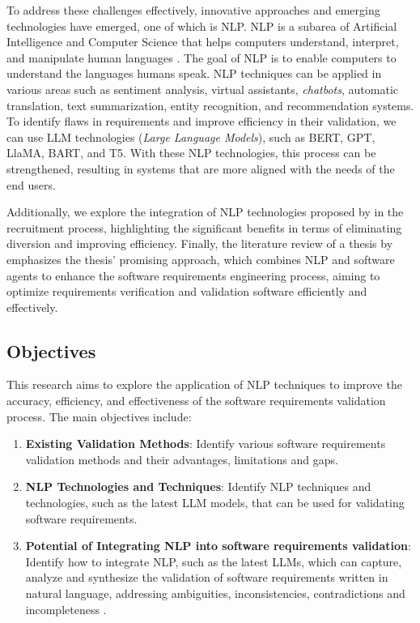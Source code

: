 To address these challenges effectively, innovative approaches and emerging technologies have emerged, one of which is NLP. NLP is a subarea of Artificial Intelligence and Computer Science that helps computers understand, interpret, and manipulate human languages \cite{bird2009}. The goal of NLP is to enable computers to understand the languages humans speak\cite{freeth2012nlp}. NLP techniques can be applied in various areas such as sentiment analysis, virtual assistants, \textit{chatbots}, automatic translation, text summarization, entity recognition, and recommendation systems\cite{Kumar2023}. To identify flaws in requirements and improve efficiency in their validation, we can use LLM technologies (\textit{Large Language Models}), such as BERT, GPT, LlaMA, BART, and T5\cite{Thirunavukarasu2023}. With these NLP technologies, this process can be strengthened, resulting in systems that are more aligned with the needs of the end users.

Additionally, we explore the integration of NLP technologies proposed by\cite{Alamelu2021} in the recruitment process, highlighting the significant benefits in terms of eliminating diversion and improving efficiency. Finally, the literature review of a thesis by\cite{Sayao2007} emphasizes the thesis' promising approach, which combines NLP and software agents to enhance the software requirements engineering process, aiming to optimize requirements verification and validation software efficiently and effectively.

\subsection{Objectives}
This research aims to explore the application of NLP techniques to improve the accuracy, efficiency, and effectiveness of the software requirements validation process. The main objectives include:
\begin{enumerate}
    \item \textbf{Existing Validation Methods}: Identify various software requirements validation methods and their advantages, limitations and gaps\cite{Atoum2021}.
    \item \textbf{NLP Technologies and Techniques}: Identify NLP techniques and technologies, such as the latest LLM models, that can be used for validating software requirements\cite{Gartner2024}.
   \item \textbf{Potential of Integrating NLP into software requirements validation}: Identify how to integrate NLP, such as the latest LLMs, which can capture, analyze and synthesize the validation of software requirements written in natural language, addressing ambiguities, inconsistencies, contradictions and incompleteness \cite{Gartner2024}.
\end{enumerate}


